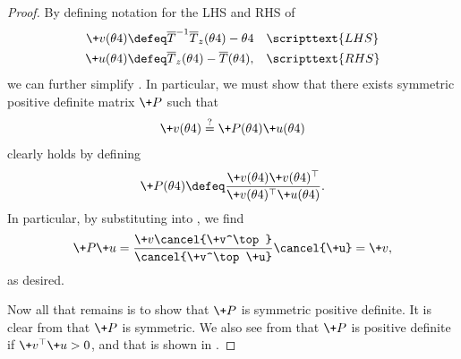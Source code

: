 \documentclass{article} %
\newcommand{\param}{\theta}
\newcommand{\transformationMatrixGradientToEMStep}{\+P}
\begin{document}
\begin{proof}
By defining notation for the LHS and RHS of 
%
\begin{align}
\+v(\param^^t)& \defeq \overline{T}^{-1} \overline{T}_z(\param^^t) - \param^^t && \scripttext{LHS} \\
\+u(\param^^t)& \defeq \overline{T}_z(\param^^t)  - 	\overline{T}(\param^^t), && \scripttext{RHS}
\end{align}
%
we can further simplify .  In particular, we must show that there exists symmetric positive definite matrix $\transformationMatrixGradientToEMStep$ such that
%
\begin{align}
\+v(\param^^t) \stackrel{?}{=} \transformationMatrixGradientToEMStep(\param^^t)  \+u(\param^^t)
\label{eqn:relating_the_EM_step_to_the_ordinary_gradient__VERY_compact_notation}
\end{align}
%
 clearly holds by defining
%
\begin{align}
\transformationMatrixGradientToEMStep(\param^^t) \defeq  \frac{\+v(\param^^t) \+v(\param^^t)^\top}{\+v(\param^^t)^\top \+u(\param^^t)}.
\label{eqn:solution_to_transformation_matrix_relating_the_EM_step_to_the_ordinary_gradient__VERY_compact_notation} 
\end{align}
%
In particular, by substituting   into , we find 
%
\begin{align}
\transformationMatrixGradientToEMStep \+u =  \frac{\+v \cancel{\+v^\top}}{\cancel{\+v^\top \+u}} \cancel{\+u} = \+v,
\end{align}
%
as desired.  

Now all that remains is to show that $\transformationMatrixGradientToEMStep$ is symmetric positive definite.  It is clear from  that $\transformationMatrixGradientToEMStep$ is symmetric.  We also see from  that $\transformationMatrixGradientToEMStep$ is positive definite if $\+v^\top \+u >0$, and that is shown in \citet[Eqn.~26]{salakhutdinov2002relationship}.
\end{proof}
\end{document}
